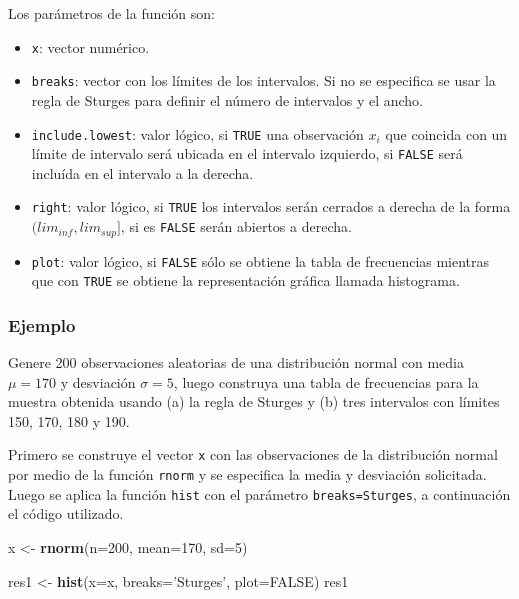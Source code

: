 \documentclass[10pt,]{krantz}
\makeatletter
\newenvironment{Shaded}{\begin{snugshade}}{\end{snugshade}}
\newcommand{\KeywordTok}[1]{\textcolor[rgb]{0.13,0.29,0.53}{\textbf{#1}}}
\newcommand{\DataTypeTok}[1]{\textcolor[rgb]{0.13,0.29,0.53}{#1}}
\newcommand{\DecValTok}[1]{\textcolor[rgb]{0.00,0.00,0.81}{#1}}
\newcommand{\StringTok}[1]{\textcolor[rgb]{0.31,0.60,0.02}{#1}}
\newcommand{\OtherTok}[1]{\textcolor[rgb]{0.56,0.35,0.01}{#1}}
\newcommand{\NormalTok}[1]{#1}
\providecommand{\tightlist}{%
  \setlength{\itemsep}{0pt}\setlength{\parskip}{0pt}}
\newenvironment{kframe}{%
\medskip{}
\setlength{\fboxsep}{.8em}
 \def\at@end@of@kframe{}%
 \ifinner\ifhmode%
  \def\at@end@of@kframe{\end{minipage}}%
  \begin{minipage}{\columnwidth}%
 \fi\fi%
 \def\FrameCommand##1{\hskip\@totalleftmargin \hskip-\fboxsep
 \colorbox{shadecolor}{##1}\hskip-\fboxsep
     \hskip-\linewidth \hskip-\@totalleftmargin \hskip\columnwidth}%
 \MakeFramed {\advance\hsize-\width
   \@totalleftmargin\z@ \linewidth\hsize
   \@setminipage}}%
 {\par\unskip\endMakeFramed%
 \at@end@of@kframe}
\renewenvironment{Shaded}{\begin{kframe}}{\end{kframe}}
\makeatother
\begin{document}
Los parámetros de la función son:

\begin{itemize}
\tightlist
\item
  \texttt{x}: vector numérico.
\item
  \texttt{breaks}: vector con los límites de los intervalos. Si no se
  especifica se usar la regla de Sturges para definir el número de
  intervalos y el ancho.
\item
  \texttt{include.lowest}: valor lógico, si \texttt{TRUE} una
  observación \(x_i\) que coincida con un límite de intervalo será
  ubicada en el intervalo izquierdo, si \texttt{FALSE} será incluída en
  el intervalo a la derecha.
\item
  \texttt{right}: valor lógico, si \texttt{TRUE} los intervalos serán
  cerrados a derecha de la forma \((lim_{inf}, lim_{sup}]\), si es
  \texttt{FALSE} serán abiertos a derecha.
\item
  \texttt{plot}: valor lógico, si \texttt{FALSE} sólo se obtiene la
  tabla de frecuencias mientras que con \texttt{TRUE} se obtiene la
  representación gráfica llamada histograma.
\end{itemize}

\subsubsection*{Ejemplo}\label{ejemplo-13}

Genere 200 observaciones aleatorias de una distribución normal con media
\(\mu=170\) y desviación \(\sigma=5\), luego construya una tabla de
frecuencias para la muestra obtenida usando (a) la regla de Sturges y
(b) tres intervalos con límites 150, 170, 180 y 190.

Primero se construye el vector \texttt{x} con las observaciones de la
distribución normal por medio de la función \texttt{rnorm} y se
especifica la media y desviación solicitada. Luego se aplica la función
\texttt{hist} con el parámetro
\texttt{breaks=\textquotesingle{}Sturges\textquotesingle{}}, a
continuación el código utilizado.

\begin{Shaded}
\begin{Highlighting}[]
\NormalTok{x <-}\StringTok{ }\KeywordTok{rnorm}\NormalTok{(}\DataTypeTok{n=}\DecValTok{200}\NormalTok{, }\DataTypeTok{mean=}\DecValTok{170}\NormalTok{, }\DataTypeTok{sd=}\DecValTok{5}\NormalTok{)}

\NormalTok{res1 <-}\StringTok{ }\KeywordTok{hist}\NormalTok{(}\DataTypeTok{x=}\NormalTok{x, }\DataTypeTok{breaks=}\StringTok{'Sturges'}\NormalTok{, }\DataTypeTok{plot=}\OtherTok{FALSE}\NormalTok{)}
\NormalTok{res1}
\end{Highlighting}
\end{Shaded}
\end{document}
